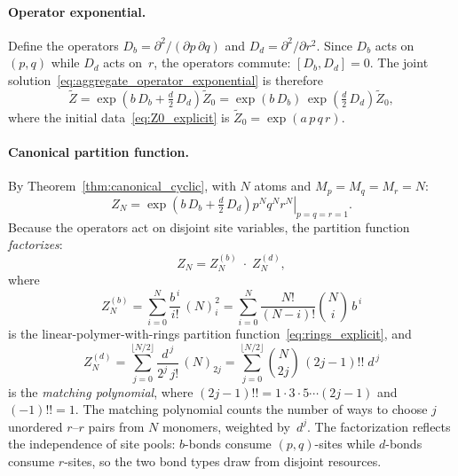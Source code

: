 \documentclass[11pt]{amsart}
\newcommand{\GFensemble}{Z}
\theoremstyle{definition}
\theoremstyle{plain}
\theoremstyle{remark}
\begin{document}
\paragraph{Operator exponential.}
Define the operators $D_b = \partial^2/(\partial p\,\partial q)$ and $D_d = \partial^2/\partial r^2$.
Since $D_b$ acts on $(p,q)$ while $D_d$ acts on~$r$, the operators commute: $[D_b,D_d]=0$.
The joint solution~\eqref{eq:aggregate_operator_exponential} is therefore
\begin{equation}\label{eq:xl_operator_exp}
\widetilde{\GFensemble}
= \exp\!\left(b\,D_b + \tfrac{d}{2}\,D_d\right)\widetilde{\GFensemble}_0
= \exp(b\,D_b)\,\exp\!\left(\tfrac{d}{2}\,D_d\right)\widetilde{\GFensemble}_0,
\end{equation}
where the initial data~\eqref{eq:Z0_explicit} is $\widetilde{\GFensemble}_0 = \exp(a\,p\,q\,r)$.

\paragraph{Canonical partition function.}
By Theorem~\ref{thm:canonical_cyclic}, with $N$ atoms and $M_p=M_q=M_r=N$:
\begin{equation}\label{eq:xl_canonical}
\GFensemble_N
= \left.\exp\!\left(b\,D_b + \tfrac{d}{2}\,D_d\right)
p^N q^N r^N\right|_{p=q=r=1}.
\end{equation}
Because the operators act on disjoint site variables, the partition function \emph{factorizes}:
\begin{equation}\label{eq:xl_factorization}
\GFensemble_N = \GFensemble_N^{(b)}\;\cdot\;\GFensemble_N^{(d)},
\end{equation}
where
\begin{equation}\label{eq:xl_ZNb}
\GFensemble_N^{(b)}
= \sum_{i=0}^{N}\frac{b^{\,i}}{i!}\,(N)_i^2
= \sum_{i=0}^{N}\frac{N!}{(N-i)!}\binom{N}{i}\,b^{\,i}
\end{equation}
is the linear-polymer-with-rings partition function~\eqref{eq:rings_explicit}, and
\begin{equation}\label{eq:xl_ZNd}
\GFensemble_N^{(d)}
= \sum_{j=0}^{\lfloor N/2\rfloor}\frac{d^{\,j}}{2^j\,j!}\,(N)_{2j}
= \sum_{j=0}^{\lfloor N/2\rfloor}\binom{N}{2j}\,(2j-1)!!\;d^{\,j}
\end{equation}
is the \emph{matching polynomial}, where $(2j{-}1)!! = 1\cdot 3\cdot 5\cdots(2j{-}1)$ and $(-1)!!=1$.
The matching polynomial counts the number of ways to choose $j$ unordered $r$--$r$ pairs from $N$ monomers, weighted by~$d^j$.
The factorization reflects the independence of site pools: $b$-bonds consume $(p,q)$-sites while $d$-bonds consume $r$-sites, so the two bond types draw from disjoint resources.
\end{document}
